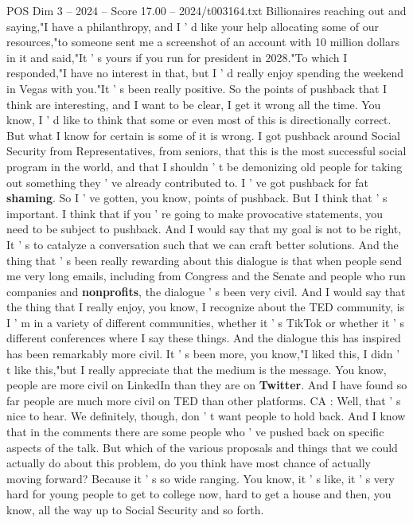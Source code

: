 \begin{textsample}{POS Dim 3 – 2024 – Score 17.00 – 2024/t003164.txt}
Billionaires reaching out and saying,"I have a philanthropy, and I ' d like your help allocating some of our resources,"to someone sent me a screenshot of an account with 10 million dollars in it and said,"It ' s yours if you run for president in 2028."To which I responded,"I have no interest in that, but I ' d really enjoy spending the weekend in Vegas with you."It ' s been really positive.
So the points of pushback that I think are interesting, and I want to be clear, I get it wrong all the time.
You know, I ' d like to think that some or even most of this is directionally correct.
But what I know for certain is some of it is wrong.
I got pushback around Social Security from Representatives, from seniors, that this is the most successful social program in the world, and that I shouldn ' t be demonizing old people for taking out something they ' ve already contributed to.
I ' ve got pushback for fat \textbf{shaming}.
So I ' ve gotten, you know, points of pushback.
But I think that ' s important.
I think that if you ' re going to make provocative statements, you need to be subject to pushback.
And I would say that my goal is not to be right, It ' s to catalyze a conversation such that we can craft better solutions.
And the thing that ' s been really rewarding about this dialogue is that when people send me very long emails, including from Congress and the Senate and people who run companies and \textbf{nonprofits}, the dialogue ' s been very civil.
And I would say that the thing that I really enjoy, you know, I recognize about the TED community, is I ' m in a variety of different communities, whether it ' s TikTok or whether it ' s different conferences where I say these things.
And the dialogue this has inspired has been remarkably more civil.
It ' s been more, you know,"I liked this, I didn ' t like this,"but I really appreciate that the medium is the message.
You know, people are more civil on LinkedIn than they are on \textbf{Twitter}.
And I have found so far people are much more civil on TED than other platforms.
CA : Well, that ' s nice to hear.
We definitely, though, don ' t want people to hold back.
And I know that in the comments there are some people who ' ve pushed back on specific aspects of the talk.
But which of the various proposals and things that we could actually do about this problem, do you think have most chance of actually moving forward?
Because it ' s so wide ranging.
You know, it ' s like, it ' s very hard for young people to get to college now, hard to get a house and then, you know, all the way up to Social Security and so forth.

\end{textsample}
